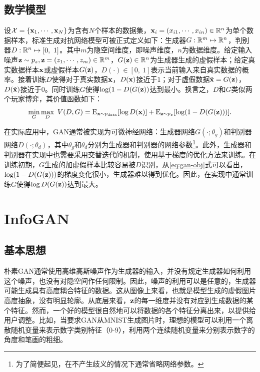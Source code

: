 \subsection{数学模型}
设$\mathcal{X} = \{\mathbf{x}_1, \cdots, \mathbf{x}_N\}$为含有$N$个样本的数据集，$\mathbf{x}_i = (x_{i1}, \cdots, x_{in}) \in \mathbb{R}^n$为单个数据样本，标准生成对抗网络模型可被正式定义如下：生成器$G: \mathbb{R}^m \mapsto \mathbb{R}^n$，判别器$D: \mathbb{R}^n \mapsto [0, ~1]$。其中$m$为隐空间维度，即噪声维度，$n$为数据维度。给定输入噪声$\mathbf{z} \sim p_z, \mathbf{z} = (z_1, \cdots, z_m) \in \mathbb{R}^m$，$G(\mathbf{z}) \in \mathbb{R}^n$为生成器生成的虚假样本；给定真实数据样本$\mathbf{x}$或虚假样本$G(\mathbf{z})$，$D(\cdot) \in [0,~1]$表示当前输入来自真实数据的概率。接着训练$D$使得对于真实数据$\mathbf{x}$，$D(\mathbf{x})$接近于$1$；对于虚假数据$\tilde{\mathbf{x}} = G(\mathbf{z})$，$D(\tilde{\mathbf{x}})$接近于$0$。同时训练$G$使得$\log(1 - D(G(\mathbf{z}))$达到最小。换言之，$D$和$G$类似两个玩家博弈，其价值函数如下：
\begin{equation}
  \min_G\max_D ~V(D,G) =
    \text{E}_{\mathbf{x} \sim p_{\text{data}}}[\log D(\mathbf{x})] + 
    \text{E}_{\mathbf{z} \sim p_z}[\log(1-D(G(\mathbf{z})))].
  \label{eq:gan-obj}
\end{equation}

在实际应用中，GAN通常被实现为可微神经网络：生成器网络$G(\cdot; {\theta}_g)$和判别器网络$D(\cdot; {\theta}_d)$，其中${\theta}_g$和${\theta}_d$分别为生成器和判别器的网络参数\footnote{为了简便起见，在不产生歧义的情况下通常省略网络参数。}。此外，生成器和判别器在实现中也需要采用交替迭代的机制，使用基于梯度的优化方法来训练。在训练初期，$G$生成的加虚假样本比较容易被$D$识别，从\eqref{eq:gan-obj}式可以看出，$\log(1 - D(G(\mathbf{z})))$的梯度变化很小，生成器难以得到优化。因此，在实现中通常训练$G$使得$\log D(G(\mathbf{z}))$达到最大。

\section{InfoGAN}\label{sec:infogan}
\subsection{基本思想}
朴素GAN通常使用高维高斯噪声作为生成器的输入，并没有规定生成器如何利用这个噪声，也没有对隐空间作任何限制。因此，噪声的利用可以是任意的，生成器可能生成具有高度耦合特征的数据。这从图像上来看，也就是模型生成的虚假图片高度抽象，没有明显轮廓。从底层来看，$\mathbf{z}$的每一维度并没有对应到生成数据的某个特征。然而，一个好的模型很自然地可以将数据的各个特征分离出来，以提供给用户调整。比如，当要求GAN从MNIST\citep{lecun1989backpropagation}生成图片时，理想的模型可以利用一个离散随机变量来表示数字类别特征（0-9），利用两个连续随机变量来分别表示数字的角度和笔画的粗细。

